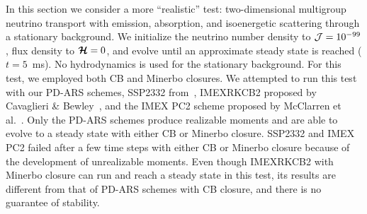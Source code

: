 In this section we consider a more ``realistic'' test: two-dimensional multigroup neutrino transport with emission, absorption, and isoenergetic scattering through a stationary background.  
We initialize the neutrino number density to $\mathcal{J} = 10^{-99}$, flux density to $\boldsymbol{\mathcal{H}}=0$, and evolve until an approximate steady state is reached ($t=5$~ms).
No hydrodynamics is used for the stationary background.
For this test, we employed both CB and Minerbo closures.  
We attempted to run this test with our PD-ARS schemes, SSP2332 from~\cite{pareschiRusso_2005}, IMEXRKCB2 proposed by Cavaglieri \& Bewley~\cite{cavaglieriBewley2015}, and the IMEX PC2 scheme proposed by McClarren et al.~\cite{mcclarren_etal_2008}.
Only the PD-ARS schemes produce realizable moments and are able to evolve to a steady state with either CB or Minerbo closure.
SSP2332 and IMEX PC2 failed after a few time steps with either CB or Minerbo closure because of the development of unrealizable moments.
Even though IMEXRKCB2 with Minerbo closure can run and reach a steady state in this test, its results are different from that of PD-ARS schemes with CB closure, and there is no guarantee of stability.

